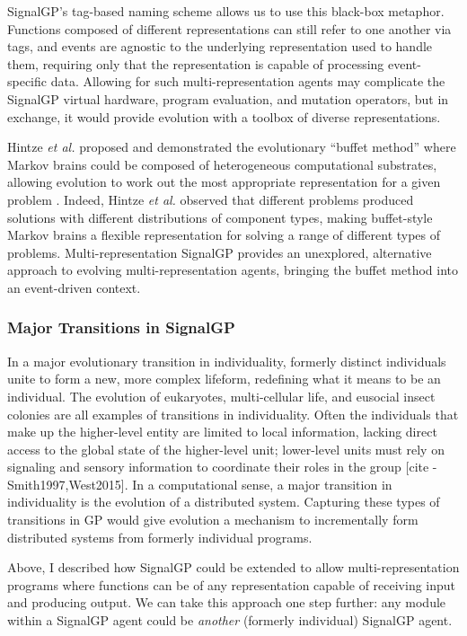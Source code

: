 SignalGP's tag-based naming scheme allows us to use this black-box metaphor. 
Functions composed of different representations can still refer to one another via tags, and events are agnostic to the underlying representation used to handle them, requiring only that the representation is capable of processing event-specific data. 
Allowing for such multi-representation agents may complicate the SignalGP virtual hardware, program evaluation, and mutation operators, but in exchange, it would provide evolution with a toolbox of diverse representations. 

Hintze \textit{et al.} proposed and demonstrated the evolutionary ``buffet method'' where Markov brains could be composed of heterogeneous computational substrates, allowing evolution to work out the most appropriate representation for a given problem \citep{hintze_buffet_2019}. 
Indeed, Hintze \textit{et al.} observed that different problems produced solutions with different distributions of component types, making buffet-style Markov brains a flexible representation for solving a range of different types of problems. 
Multi-representation SignalGP provides an unexplored, alternative approach to evolving multi-representation agents, bringing the buffet method into an event-driven context.

\subsubsection{Major Transitions in SignalGP}

In a major evolutionary transition in individuality, formerly distinct individuals unite to form a new, more complex lifeform, redefining what it means to be an individual. 
The evolution of eukaryotes, multi-cellular life, and eusocial insect colonies are all examples of transitions in individuality. 
Often the individuals that make up the higher-level entity are limited to local information, lacking direct access to the global state of the higher-level unit; lower-level units must rely on signaling and sensory information to coordinate their roles in the group [cite - Smith1997,West2015].
In a computational sense, a major transition in individuality is the evolution of a distributed system.
Capturing these types of transitions in GP would give evolution a mechanism to incrementally form distributed systems from formerly individual programs. 

Above, I described how SignalGP could be extended to allow multi-representation programs where functions can be of any representation capable of receiving input and producing output. 
We can take this approach one step further: any module within a SignalGP agent could be \textit{another} (formerly individual) SignalGP agent. 
 
